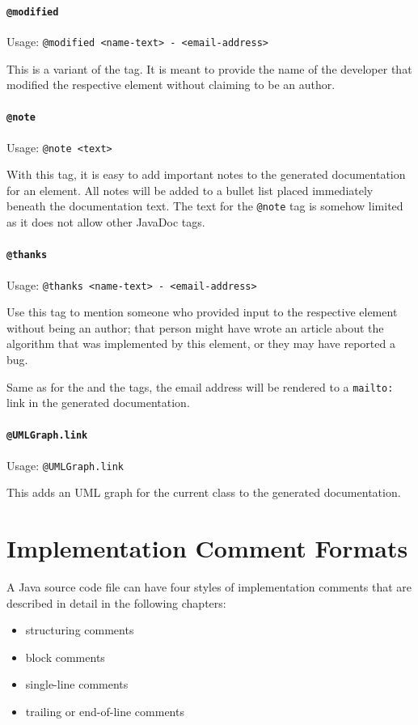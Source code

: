 \documentclass[11pt,a4paper, titlepage, parskip=half, headsepline, footsepline, cleardoublepage=current, headheight=1cm]{scrbook}
\begin{document}
\paragraph{\lstinline|@modified|}\label{sec:TagModified}  Usage: \lstinline|@modified <name-text> - <email-address>|

This is a variant of the  tag. It is meant to provide the name of the developer that modified the respective element without claiming to be an author.

\paragraph{\lstinline|@note|}\label{sec:TagNote}  Usage: \lstinline|@note <text>|

With this tag, it is easy to add important notes to the generated documentation for an element. All notes will be added to a bullet list placed immediately beneath the documentation text. The text for the \lstinline|@note| tag is somehow limited as it does not allow other JavaDoc tags.

\paragraph{\lstinline|@thanks|}\label{sec:TagThanks}  Usage: \lstinline|@thanks <name-text> - <email-address>|

Use this tag to mention someone who provided input to the respective element without being an author; that person might have wrote an article about the algorithm that was implemented by this element, or they may have reported a bug.

Same as for the  and the  tags, the email address will be rendered to a \verb#mailto:# link in the generated documentation.

\paragraph{\lstinline|@UMLGraph.link|}\label{sec:TagUMLGraph}  Usage: \lstinline|@UMLGraph.link|

This adds an UML graph for the current class to the generated documentation.


\section{Implementation Comment Formats}
A Java source code file can have four styles of implementation comments that are described in detail in the following chapters:
\begin{itemize}[nosep]
\item{structuring comments}
\item{block comments}
\item{single-line comments}
\item{trailing or end-of-line comments}
\end{itemize}
\end{document}
